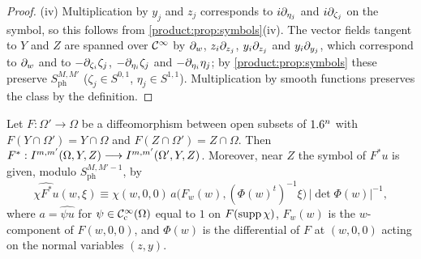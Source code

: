 \begin{proof}
(iv) Multiplication by $y_j$ and $z_j$ corresponds to $i\partial_{\eta_j}$ and
$i\partial_{\zeta_j}$ on the symbol, so this follows from
\cref{product:prop:symbols}(iv). The vector fields tangent to $Y$ and $Z$ are
spanned over $\mathcal{C}^\infty$ by $\partial_{w}$, $z_i\partial_{z_j}$, $y_i\partial_{z_j}$ and $y_i\partial_{y_j}$,
which correspond to $\partial_w$ and to $-\partial_{\zeta_i}\zeta_j$, $-\partial_{\eta_i}\zeta_j$
and $-\partial_{\eta_i}\eta_j$; by \cref{product:prop:symbols} these preserve
$S^{M,M'}_{\mathrm{ph}}$ ($\zeta_j\in S^{0,1}$, $\eta_j\in S^{1,1}$). Multiplication
by smooth functions preserves the class by the definition.
\end{proof}

\begin{proposition}[Invariance]\label{product:prop:conormal-invariance}
Let $F:\Omega'\longrightarrow\Omega$ be a diffeomorphism between open subsets of
$1.6^n$ with $F(Y\cap\Omega')=Y\cap\Omega$ and $F(Z\cap\Omega')=Z\cap\Omega$. Then
$F^*:I^{m,m'}(\Omega,Y,Z)\longrightarrow I^{m,m'}(\Omega',Y,Z)$. Moreover, near
$Z$ the symbol of $F^*u$ is given, modulo $S^{M,M'-1}_{\mathrm{ph}}$, by
\begin{equation}\label{product:eq:symbol-change}
\widehat{\chi F^*u}(w,\xi)\equiv\chi(w,0,0)\,a\big(F_w(w),(\Phi(w)^t)^{-1}\xi\big)
\,|\det\Phi(w)|^{-1},
\end{equation}
where $a=\widehat{\psi u}$ for $\psi\in\mathcal{C}^\infty_{\mathrm{c}}(\Omega)$ equal to $1$ on
$F(\operatorname{supp}\chi)$, $F_w(w)$ is the $w$-component of $F(w,0,0)$, and $\Phi(w)$ is the
differential of $F$ at $(w,0,0)$ acting on the normal variables $(z,y)$.
\end{proposition}

